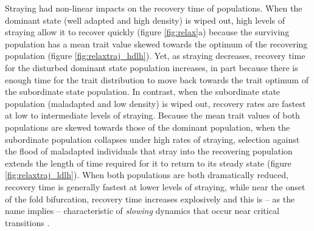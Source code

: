 \documentclass[twocolumn,preprintnumbers,amsmath,amssymb,superscriptaddress]{revtex4}
\begin{document}
Straying had non-linear impacts on the recovery time of populations. 
When the dominant state (well adapted and high density) is wiped out, high levels of straying allow it to recover quickly (figure \ref{fig:relax}a) because the surviving population has a mean trait value skewed towards the optimum of the recovering population (figure \ref{fig:relaxtraj_hdlh}).
Yet, as straying decreases, recovery time for the disturbed dominant state population increases, in part because there is enough time for the trait distribution to move back towards the trait optimum of the subordinate state population.
In contrast, when the subordinate state population (maladapted and low density) is wiped out, recovery rates are fastest at low to intermediate levels of straying.
Because the mean trait values of both populations are skewed towards those of the dominant population, when the subordinate population collapses under high rates of straying, selection against the flood of maladapted individuals that stray into the recovering population extends the length of time required for it to return to its steady state (figure \ref{fig:relaxtraj_ldlh}).
When both populations are both dramatically reduced, recovery time is generally fastest at lower levels of straying, while near the onset of the fold bifurcation, recovery time increases explosively and this is -- as the name implies -- characteristic of \emph{slowing} dynamics that occur near critical transitions \cite{Scheffer:2009gg,Kuehn:2010p2591}.\\
\end{document}

